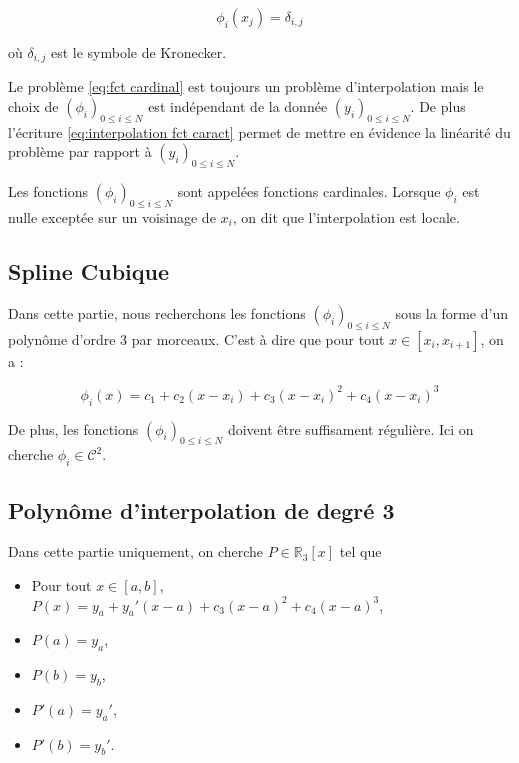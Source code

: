 \begin{equation}
\phi_i ( x_j ) = \delta_{i,j}
\label{eq:fct cardinal}
\end{equation}

où $\delta_{i,j}$ est le symbole de Kronecker.

\begin{remarque}
Le problème \eqref{eq:fct cardinal} est toujours un problème d'interpolation mais le choix de $(\phi_i)_{0 \leq i \leq N}$ est indépendant de la donnée $(y_i)_{0 \leq i \leq N}$. De plus l'écriture \eqref{eq:interpolation fct caract} permet de mettre en évidence la linéarité du problème par rapport à $(y_i)_{0 \leq i \leq N}$.
\end{remarque}

Les fonctions $(\phi_i)_{0 \leq i \leq N}$ sont appelées fonctions cardinales. Lorsque $\phi_i$ est nulle exceptée sur un voisinage de $x_i$, on dit que l'interpolation est locale.

\subsection{Spline Cubique}

Dans cette partie, nous recherchons les fonctions $(\phi_i)_{0 \leq i \leq N}$ sous la forme d'un polynôme d'ordre 3 par morceaux. C'est à dire que pour tout $x \in [x_i, x_{i+1}]$, on a :

\begin{equation}
\phi_i(x) = c_1 + c_2 (x-x_i) + c_3 (x-x_i)^2 + c_4 (x-x_i)^3
\end{equation}

De plus, les fonctions $(\phi_i)_{0 \leq i \leq N}$ doivent être suffisament régulière. Ici on cherche $\phi_i \in \mathcal{C}^2$.

\subsection{Polynôme d'interpolation de degré 3}

Dans cette partie uniquement, on cherche $P\in \mathbb{R}_3 [x]$ tel que 

\begin{itemize}
\item Pour tout $x \in [a,b]$, $P(x) = y_a + y_a' (x-a) + c_3 (x-a)^2 + c_4 (x-a)^3$,
\item $P(a)=y_a$,
\item $P(b)=y_b$,
\item $P'(a)=y_a'$,
\item $P'(b)=y_b'$.
\end{itemize}

